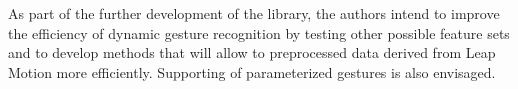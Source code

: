 As part of the further development of the library, the authors intend to improve the efficiency of dynamic gesture recognition by testing other possible feature sets and to develop methods that will allow to preprocessed data derived from Leap Motion more efficiently. Supporting of parameterized gestures is also envisaged.

